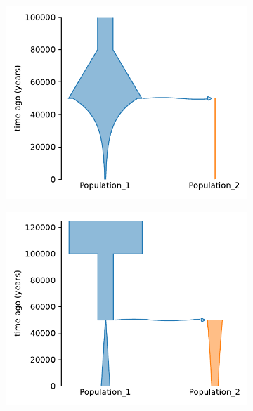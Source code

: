 \documentclass[a4paper,14pt,oneside,openany,article]{memoir}
\begin{document}
\begin{figure}[h]
    \centering
    \begin{subfigure}[c]{.32\textwidth}
    \includegraphics[width=\textwidth]{images_2/picture_2pops_str_2.pdf}
    \caption{}
    \label{fig:auto:struct_2_1_0_ex_1}
    \end{subfigure}%
    \begin{subfigure}[c]{.32\textwidth}
    \includegraphics[width=\textwidth]{images_2/picture_2pops_str_3.pdf}
    \caption{}
    \label{fig:auto:struct_2_1_0_ex_2}
    \end{subfigure}%
    \begin{subfigure}[c]{.32\textwidth}

\end{subfigure}
\end{figure}
\end{document}
